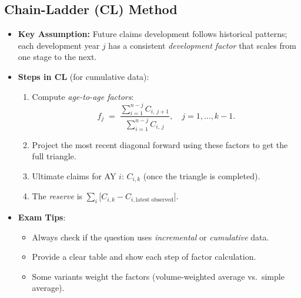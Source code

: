 \documentclass[13pt,a4paper]{article}
\begin{document}
\subsection{Chain-Ladder (CL) Method}
\begin{itemize}
  \item \textbf{Key Assumption:} Future claims development follows historical patterns; each development year \(j\) has a consistent \emph{development factor} that scales from one stage to the next.
  \item \textbf{Steps in CL} (for cumulative data):
    \begin{enumerate}
      \item Compute \emph{age-to-age factors}:
      \[
        f_j \;=\; \frac{\sum_{i=1}^{n-j} C_{i,\,j+1}}{\sum_{i=1}^{n-j} C_{i,\,j}}, 
        \quad j=1,\dots,k-1.
      \]
      \item Project the most recent diagonal forward using these factors to get the full triangle.
      \item Ultimate claims for AY \(i\): \(C_{i,k}\) (once the triangle is completed).
      \item The \emph{reserve} is \(\sum_i \bigl[C_{i,k} - C_{i,\text{latest observed}}\bigr]\).
    \end{enumerate}
  \item \textbf{Exam Tips}:
    \begin{itemize}
      \item Always check if the question uses \emph{incremental} or \emph{cumulative} data.
      \item Provide a clear table and show each step of factor calculation.
      \item Some variants weight the factors (volume-weighted average vs.\ simple average).
    \end{itemize}
\end{itemize}
\end{document}
